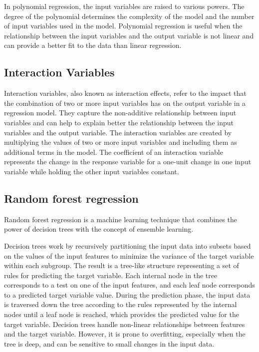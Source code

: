 \documentclass[
]{article}
\begin{document}
In polynomial regression, the input variables are raised to various
powers. The degree of the polynomial determines the complexity of the
model and the number of input variables used in the model. Polynomial
regression is useful when the relationship between the input variables
and the output variable is not linear and can provide a better fit to
the data than linear regression.

\hypertarget{interaction-variables}{%
\subsection{Interaction Variables}\label{interaction-variables}}

Interaction variables, also known as interaction effects, refer to the
impact that the combination of two or more input variables has on the
output variable in a regression model. They capture the non-additive
relationship between input variables and can help to explain better the
relationship between the input variables and the output variable. The
interaction variables are created by multiplying the values of two or
more input variables and including them as additional terms in the
model. The coefficient of an interaction variable represents the change
in the response variable for a one-unit change in one input variable
while holding the other input variables constant.

\hypertarget{random-forest-regression}{%
\subsection{Random forest regression}\label{random-forest-regression}}

Random forest regression is a machine learning technique that combines
the power of decision trees with the concept of ensemble learning.

Decision trees work by recursively partitioning the input data into
subsets based on the values of the input features to minimize the
variance of the target variable within each subgroup. The result is a
tree-like structure representing a set of rules for predicting the
target variable. Each internal node in the tree corresponds to a test on
one of the input features, and each leaf node corresponds to a predicted
target variable value. During the prediction phase, the input data is
traversed down the tree according to the rules represented by the
internal nodes until a leaf node is reached, which provides the
predicted value for the target variable. Decision trees handle
non-linear relationships between features and the target variable.
However, it is prone to overfitting, especially when the tree is deep,
and can be sensitive to small changes in the input data.
\end{document}
